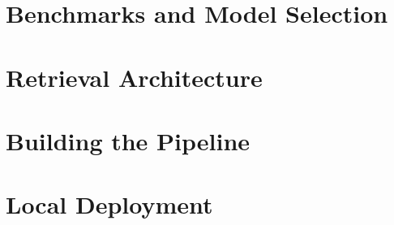 \documentclass{professional-book}
\begin{document}
\part{Benchmarks and Model Selection}




\part{Retrieval Architecture}




\part{Building the Pipeline}




\part{Local Deployment}



\backmatter

\end{document}
